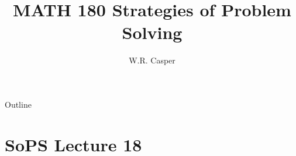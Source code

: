 \documentclass{beamer}
\title{MATH 180 Strategies of Problem Solving}
\subtitle
{} %
\author[W.R. Casper] %
{W.R. Casper}
\institute[California State University Fullerton] %
{
  Department of Mathematics\\
  California State University Fullerton}
\begin{document}
\begin{frame}
  \titlepage
\end{frame}

\begin{frame}{Outline}
  \tableofcontents
\end{frame}



\section{SoPS Lecture 18}
\end{document}

